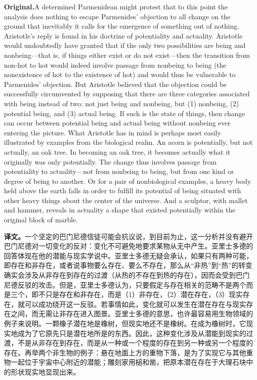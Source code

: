 \documentclass[UTF8]{ctexart}
\newcommand{\orig}{\par\noindent\textbf{Original.}\quad}
\newcommand{\zh}{\par\noindent\textbf{译文。}\quad}
\begin{document}
\orig A determined Parmenidean might protest that to this point the analysis does nothing to escape Parmenides' objection to all change on the ground that inevitably it calls for the emergence of something out of nothing. Aristotle's reply is found in his doctrine of potentiality and actuality. Aristotle would undoubtedly have granted that if the only two possibilities are being and nonbeing---that is, if things either exist or do not exist---then the transition from non-hot to hot would indeed involve passage from nonbeing to being (the nonexistence of hot to the existence of hot) and would thus be vulnerable to Parmenides' objection. But Aristotle believed that the objection could be successfully circumvented by supposing that there are three categories associated with being instead of two: not just being and nonbeing, but (1) nonbeing, (2) potential being, and (3) actual being. If such is the state of things, then change can occur between potential being and actual being without nonbeing ever entering the picture. What Aristotle has in mind is perhaps most easily illustrated by examples from the biological realm. An acorn is potentially, but not actually, an oak tree. In becoming an oak tree, it becomes actually what it originally was only potentially. The change thus involves passage from potentiality to actuality---not from nonbeing to being, but from one kind or degree of being to another. Or for a pair of nonbiological examples, a heavy body held above the earth falls in order to fulfill its potential of being situated with other heavy things about the center of the universe. And a sculptor, with mallet and hammer, reveals in actuality a shape that existed potentially within the original block of marble.

\zh 一个坚定的巴门尼德信徒可能会抗议说，到目前为止，这一分析并没有避开巴门尼德对一切变化的反对：变化不可避免地要求某物从无中产生。亚里士多德的回答体现在他的潜能与现实学说中。亚里士多德无疑会承认，如果只有两种可能，即存在和非存在，或者说事物要么存在、要么不存在，那么从“非热”到“热”的转变确实会涉及从非存在到存在的过渡（从热的不存在到热的存在），因而会受到巴门尼德反驳的攻击。但是，亚里士多德认为，只要假定与存在相关的范畴不是两个而是三个，即不只是存在和非存在，而是（1）非存在，（2）潜在存在，（3）现实存在，就可以成功绕开这一反驳。若事情如此，变化就可以发生在潜在存在与现实存在之间，而无需让非存在进入图景。亚里士多德的意思，也许最容易用生物领域的例子来说明。一颗橡子潜在地是橡树，但现实地还不是橡树。在成为橡树时，它现实地成为了它原先只是潜在地所是的东西。因此，这种变化涉及从潜能到现实的过渡，不是从非存在到存在，而是从一种或一个程度的存在到另一种或另一个程度的存在。再举两个非生物的例子：悬在地面上方的重物下落，是为了实现它与其他重物一起位于宇宙中心附近的潜能；雕刻家用槌和凿，把原本潜在存在于大理石块中的形状现实地显现出来。
\end{document}
